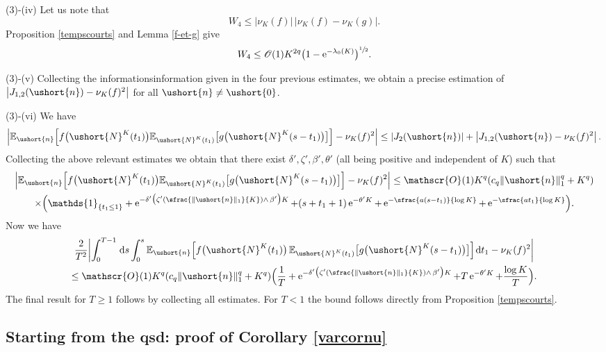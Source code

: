 \documentclass[10pt]{amsart}
\newcommand{\Psfrac}[2]{(\sfrac{#1}{#2})}
\newcommand{\scaleto}[2]{#1}
\let\mathcal\mathscr
\numberwithin{equation}{section}
\theoremstyle{plain}
\theoremstyle{definition}
\newcommand{\E}{{\mathbb{E}}}
\newcommand{\Oun}{\mathcal{O}(1)}
\newcommand{\un}{\mathds{1}}
\newcommand{\vecn}{\ushort{n}}
\newcommand{\veczer}{\ushort{0}}
\newcommand{\leproc}{\ushort{N}^{K}}
\newcommand{\sleproc}{\ushort{N}^{K}}
\newcommand{\nuk}{\nu_{K}}\let\snuk\nuk
\newcommand{\e}{\operatorname{e}}
\newcommand{\dd}{\hspace{1pt}\mathrm{d}}
\newcommand{\norm}[1]{\|#1\|_{1}}\let\snorm\norm
\begin{document}
(3)-(iv) Let us note that
\[
W_{4} \leq |\nuk(f)| \,|\nuk(f)-\nuk(g)|.
\]
Proposition \ref{tempscourts} and Lemma \ref{f-et-g} give
\[
W_{4} \leq \Oun K^{\scaleto{2q}{6pt}}\bigl(1-\e^{-\lambda_0(K)}\bigr)^{\sfrac{1}{2}}.
\]

(3)-(v) Collecting the informationsinformation given in the four previous estimates, we obtain a precise estimation
of $\left|J_{1,2}(\vecn) -\nuk(f)^2\right|$ for all $\vecn\neq \veczer$.

(3)-(vi)
We have
\[
\left|
\E_{\vecn}\Bigl[f\bigl(\leproc(t_{1})\bigr) \E_{\sleproc(t_{1}) } \bigl[g\bigl(\leproc(s-t_1)\bigr)\bigr]\Bigr]
-\nuk(f)^2
\right|
\leq |J_{2}(\vecn)| + \left|J_{1,2}(\vecn) -\nuk(f)^2
\right|.
\]
Collecting the above relevant estimates we obtain that there exist $\delta',\zeta', \beta', \theta'$ (all being positive and independent
of $K$) such that
\begin{multline*}
\left|
\E_{\vecn}\Bigl[f\bigl(\leproc(t_{1})\bigr) \E_{\sleproc(t_{1}) } \bigl[g\bigl(\leproc(s-t_1)\bigr)\bigr]\Bigr]-\nuk(f)^2
\right| \leq \Oun K^q (c_q\norm{\vecn}^{q} +K^q)\\
\times \Bigl(
\un_{\{t_1\leq 1\}}+ \e^{-\delta'\bigl(\zeta' \Psfrac{\|\vecn\|_{1}}{K}\wedge\, \beta'\bigr)K} + (s+t_1+1)\e^{-\theta' K}
+ \e^{-\sfrac{a(s-t_{1})}{\log K}} + \e^{-\sfrac{a t_{1}}{\log K}}
\Bigr).
\end{multline*}
Now we have
\begin{multline*}
\frac{\scaleto{2}{6pt}}{T^2} \biggl|\int_{0}^{T-1} \dd s\int_{0}^{s}\E_{\vecn}
\Bigl[f\bigl(\leproc(t_{1})\bigr)\, \E_{\leproc(t_{1}) } \bigl[g\bigl(\leproc(s-t_1)\bigr)\bigr]\Bigr]\dd t_{1}- \nuk(f)^2\biggr|\\
\leq \Oun K^q (c_q\norm{\vecn}^{q} +K^q)
\Bigl(
\frac{1}{T}+ \e^{-\delta'\bigl(\zeta' \Psfrac{\|\vecn\|_{1}}{K}\wedge\, \beta'\bigr)K} + T \e^{-\theta' K} + \frac{\log K}{T}
\Bigr).
\end{multline*}
The final result for $T\geq 1$ follows by collecting all estimates. For $T<1$ the bound follows directly from Proposition \ref{tempscourts}.

\subsection{Starting from the qsd: proof of Corollary \ref{varcornu}}
\end{document}
